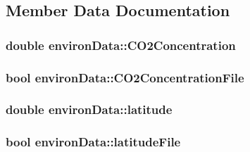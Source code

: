 \subsection{Member Data Documentation}
\hypertarget{classenviron_data_a3dc8ee3621f212db9a491f8c5f89d2f1}{
\subsubsection[{CO2Concentration}]{\setlength{\rightskip}{0pt plus 5cm}double {\bf environData::CO2Concentration}}}
\label{classenviron_data_a3dc8ee3621f212db9a491f8c5f89d2f1}
\hypertarget{classenviron_data_a697f18bb8854f8076d40ac5e3d664ddf}{
\subsubsection[{CO2ConcentrationFile}]{\setlength{\rightskip}{0pt plus 5cm}bool {\bf environData::CO2ConcentrationFile}}}
\label{classenviron_data_a697f18bb8854f8076d40ac5e3d664ddf}
\hypertarget{classenviron_data_a70f37280fddf194d0c6f47e9391a0980}{
\subsubsection[{latitude}]{\setlength{\rightskip}{0pt plus 5cm}double {\bf environData::latitude}}}
\label{classenviron_data_a70f37280fddf194d0c6f47e9391a0980}
\hypertarget{classenviron_data_a4736bdd9c884ebe5ff74ed93891bc748}{
\subsubsection[{latitudeFile}]{\setlength{\rightskip}{0pt plus 5cm}bool {\bf environData::latitudeFile}}}
